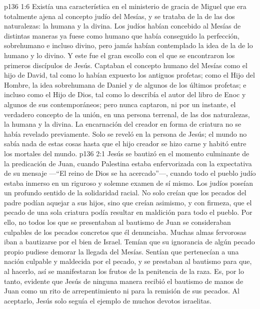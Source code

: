 \vs p136 1:6 Existía una característica en el ministerio de gracia de Miguel que era totalmente ajena al concepto judío del Mesías, y se trataba de la  de las dos naturalezas: la humana y la divina. Los judíos habían concebido al Mesías de distintas maneras ya fuese como humano que había conseguido la perfección, sobrehumano e incluso divino, pero jamás habían contemplado la idea de la  de lo humano y lo divino. Y este fue el gran escollo con el que se encontraron los primeros discípulos de Jesús. Captaban el concepto humano del Mesías como el hijo de David, tal como lo habían expuesto los antiguos profetas; como el Hijo del Hombre, la idea sobrehumana de Daniel y de algunos de los últimos profetas; e incluso como el Hijo de Dios, tal como lo describía el autor del libro de Enoc y algunos de sus contemporáneos; pero nunca captaron, ni por un instante, el verdadero concepto de la unión, en una persona terrenal, de las dos naturalezas, la humana y la divina. La encarnación del creador en forma de criatura no se había revelado previamente. Solo se reveló en la persona de Jesús; el mundo no sabía nada de estas cosas hasta que el hijo creador se hizo carne y habitó entre los mortales del mundo.
\vs p136 2:1 Jesús se bautizó en el momento culminante de la predicación de Juan, cuando Palestina estaba enfervorizada con la expectativa de su mensaje ---“El reino de Dios se ha acercado”---, cuando todo el pueblo judío estaba inmerso en un riguroso y solemne examen de sí mismo. Los judíos poseían un profundo sentido de la solidaridad racial. No solo creían que los pecados del padre podían aquejar a sus hijos, sino que creían asimismo, y con firmeza, que el pecado de una sola criatura podía resultar en maldición para todo el pueblo. Por ello, no todos los que se presentaban al bautismo de Juan se consideraban culpables de los pecados concretos que él denunciaba. Muchas almas fervorosas iban a bautizarse por el bien de Israel. Temían que su ignorancia de algún pecado propio pudiese demorar la llegada del Mesías. Sentían que pertenecían a una nación culpable y maldecida por el pecado, y se prestaban al bautismo para que, al hacerlo, así se manifestaran los frutos de la penitencia de la raza. Es, por lo tanto, evidente que Jesús de ninguna manera recibió el bautismo de manos de Juan como un rito de arrepentimiento ni para la remisión de sus pecados. Al aceptarlo, Jesús solo seguía el ejemplo de muchos devotos israelitas.
